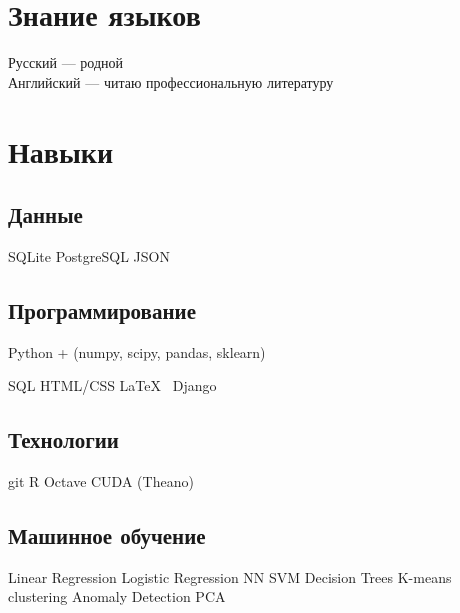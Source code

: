 \documentclass[a4paper]{resume}
\begin{document}
\begin{minipage}[t]{0.33\textwidth}
\sectionspace %


\section{Знание языков}
Русский — родной \\
Английский — читаю профессиональную литературу



\sectionspace %


\section{Навыки}

\subsection{Данные}
SQLite \textbullet{} PostgreSQL \textbullet {}JSON
\sectionspace

\subsection{Программирование}

Python + (numpy, scipy, pandas, sklearn)

SQL \textbullet{} HTML/CSS \textbullet{} \LaTeX\ \textbullet{} Django

\sectionspace

\subsection{Технологии}

git \textbullet{}  R \textbullet{} Octave \textbullet{} CUDA (Theano)

\sectionspace


\subsection{Машинное обучение}
Linear Regression\textbullet{} Logistic Regression\textbullet{} NN\textbullet{} SVM\textbullet{} Decision Trees
K-means clustering \textbullet{} Anomaly Detection \textbullet{} PCA
\sectionspace %




\end{minipage}
\end{document}
